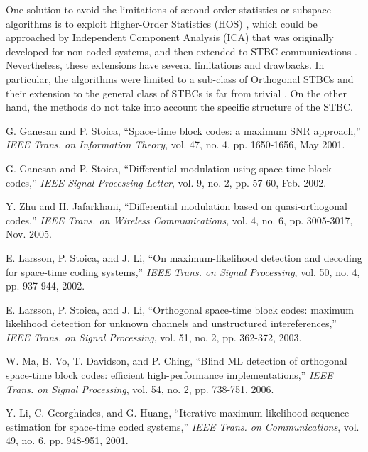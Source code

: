 \documentclass[letterpaper,10pt]{article}
\begin{document}
One solution to avoid the limitations of second-order statistics or subspace algorithms is to exploit Higher-Order Statistics (HOS) \cite{Mendel:1991}, which could be approached by Independent Component Analysis (ICA) \cite{Hyvarinen:2001} that was originally developed for non-coded systems, and then extended to STBC communications \cite{Iglesias:2008}. Nevertheless, these extensions have several limitations and drawbacks. In particular, the algorithms were limited to a sub-class of Orthogonal STBCs and their extension to the general class of STBCs is far from trivial \cite{Iglesias:2008}. On the other hand, the methods \cite{Xu:2005} do not take into account the specific structure of the STBC.

\pagebreak

\begin{thebibliography}{1}
    \setlength{\parskip}{2pt} %

   G. Ganesan and P. Stoica, ``Space-time block codes: a maximum SNR approach,'' \emph{IEEE Trans. on Information Theory}, vol. 47, no. 4, pp. 1650-1656, May 2001.

   G. Ganesan and P. Stoica, ``Differential modulation using space-time block codes,'' \emph{IEEE Signal Processing Letter}, vol. 9, no. 2, pp. 57-60, Feb. 2002.

   Y. Zhu and H. Jafarkhani, ``Differential modulation based on quasi-orthogonal codes,'' \emph{IEEE Trans. on Wireless Communications}, vol. 4, no. 6, pp. 3005-3017, Nov. 2005.

   E. Larsson, P. Stoica, and J. Li, ``On maximum-likelihood detection and decoding for space-time coding systems,'' \emph{IEEE Trans. on Signal Processing}, vol. 50, no. 4, pp. 937-944, 2002.

   E. Larsson, P. Stoica, and J. Li, ``Orthogonal space-time block codes: maximum likelihood detection for unknown channels and unstructured intereferences,'' \emph{IEEE Trans. on Signal Processing}, vol. 51, no. 2, pp. 362-372, 2003.

   W. Ma, B. Vo, T. Davidson, and P. Ching, ``Blind ML detection of orthogonal space-time block codes: efficient high-performance implementations,'' \emph{IEEE Trans. on Signal Processing}, vol. 54, no. 2, pp. 738-751, 2006.

   Y. Li, C. Georghiades, and G. Huang, ``Iterative maximum likelihood sequence estimation for space-time coded systems,'' \emph{IEEE Trans. on Communications}, vol. 49, no. 6, pp. 948-951, 2001.


\end{thebibliography}
\end{document}
